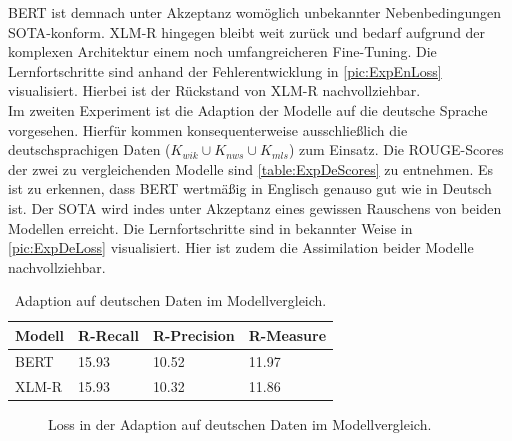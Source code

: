 \noindent
\ac{BERT} ist demnach unter Akzeptanz womöglich unbekannter Nebenbedingungen \ac{SOTA}-konform. \ac{XLM-R} hingegen bleibt weit zurück und bedarf aufgrund der komplexen Architektur einem noch umfangreicheren Fine-Tuning. Die Lernfortschritte sind anhand der Fehlerentwicklung in \autoref{pic:ExpEnLoss} visualisiert. Hierbei ist der Rückstand von \ac{XLM-R} nachvollziehbar.\\

\noindent
Im zweiten Experiment ist die Adaption der Modelle auf die deutsche Sprache vorgesehen. Hierfür kommen konsequenterweise ausschließlich die deutschsprachigen Daten ($K_{wik} \cup K_{nws} \cup K_{mls}$) zum Einsatz. Die \ac{ROUGE}-Scores der zwei zu vergleichenden Modelle sind \autoref{table:ExpDeScores} zu entnehmen. Es ist zu erkennen, dass \ac{BERT} wertmäßig in Englisch genauso gut wie in Deutsch ist. Der \ac{SOTA} wird indes unter Akzeptanz eines gewissen Rauschens von beiden Modellen erreicht. Die Lernfortschritte sind in bekannter Weise in \autoref{pic:ExpDeLoss} visualisiert. Hier ist zudem die Assimilation beider Modelle nachvollziehbar.\\

\begin{table}[htb]
\centering
\begin{tabular}{ | p{2.5cm} | p{2.5cm} | p{2.5cm} | p{2.5cm} | }
\hline
\textbf{Modell} & \textbf{R-Recall} & \textbf{R-Precision} & \textbf{R-Measure} \\
\hline
BERT & 15.93 & 10.52 & 11.97 \\
\hline
XLM-R & 15.93 & 10.32 & 11.86 \\
\hline
\end{tabular}
\caption{Adaption auf deutschen Daten im Modellvergleich.}
\label{table:ExpDeScores}
\end{table}

\begin{figure}[h]
  \centering
  \caption{Loss in der Adaption auf deutschen Daten im Modellvergleich.}
  \label{pic:ExpDeLoss}
\end{figure}
\newpage

